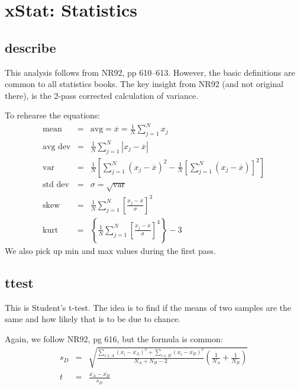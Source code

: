 \section{xStat: Statistics}
\subsection*{describe}
This analysis follows from NR92, pp 610--613.  However, the basic definitions
are common to all statistics books.  The key insight from NR92 (and not
original there), is the 2-pass corrected calculation of variance.

To rehearse the equations:
\begin{eqnarray}
  \mbox{mean} & = & \mbox{avg} = \overline{x} = 
                    \frac{1}{N}\sum_{j=1}^{N}x_j\\
  \mbox{avg dev} & = & \frac{1}{N}\sum_{j=1}^{N}|x_j-\overline{x}|\\
  \mbox{var} & = & \frac{1}{N}\left [ \sum_{j=1}^{N}(x_j-\overline{x})^2
                   - \frac{1}{N} \left [ \sum_{j=1}^{N}(x_j
                       -\overline{x})\right]^2\right]\\
  \mbox{std dev} & =& \sigma  =  \sqrt{\mbox{var}}\\
  \mbox{skew} & = & \frac{1}{N}\sum_{j=1}^{N} 
                    \left [\frac{x_j-\overline{x}}{\sigma}\right]^3\\
  \mbox{kurt} & = & \left\{\frac{1}{N}\sum_{j=1}^{N} 
                    \left [\frac{x_j-\overline{x}}{\sigma}\right]^4
                    \right\} - 3
\end{eqnarray}
We also pick up min and max values during the first pass.

\subsection*{ttest}
This is Student's t-test.  The idea is to find if the means of 
two samples are the same and how likely that is to be due to chance.

Again, we follow NR92, pg 616, but the formula
is common:
\begin{eqnarray}
s_D & =  & \sqrt{\frac{\sum_{i\in A}(x_i-\overline{x_A})^2 
                      +\sum_{i\in B}(x_i-\overline{x_B})^2}
                      {N_A+N_B-2}
                 \left(\frac{1}{N_A}+\frac{1}{N_B}\right)
                }\\
t & = & \frac{\overline{x_A}-\overline{x_B}}{s_D}
\end{eqnarray}

